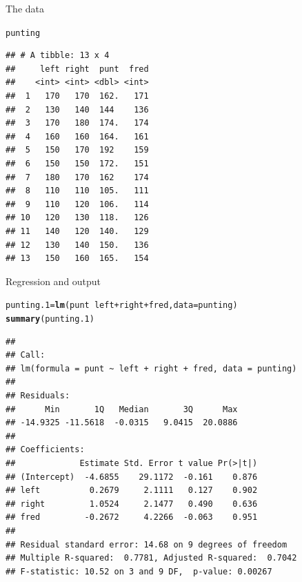\documentclass[unknownkeysallowed]{beamer}\usepackage[]{graphicx}\usepackage[]{color}
\makeatletter
\newcommand{\hlopt}[1]{\textcolor[rgb]{0,0,0}{#1}}%
\newcommand{\hlstd}[1]{\textcolor[rgb]{0.345,0.345,0.345}{#1}}%
\newcommand{\hlkwb}[1]{\textcolor[rgb]{0.69,0.353,0.396}{#1}}%
\newcommand{\hlkwc}[1]{\textcolor[rgb]{0.333,0.667,0.333}{#1}}%
\newcommand{\hlkwd}[1]{\textcolor[rgb]{0.737,0.353,0.396}{\textbf{#1}}}%
\newenvironment{kframe}{%
 \def\at@end@of@kframe{}%
 \ifinner\ifhmode%
  \def\at@end@of@kframe{\end{minipage}}%
  \begin{minipage}{\columnwidth}%
 \fi\fi%
 \def\FrameCommand##1{\hskip\@totalleftmargin \hskip-\fboxsep
 \colorbox{shadecolor}{##1}\hskip-\fboxsep
     \hskip-\linewidth \hskip-\@totalleftmargin \hskip\columnwidth}%
 \MakeFramed {\advance\hsize-\width
   \@totalleftmargin\z@ \linewidth\hsize
   \@setminipage}}%
 {\par\unskip\endMakeFramed%
 \at@end@of@kframe}
\newenvironment{knitrout}{}{} %
\makeatother
\begin{document}
\begin{frame}[fragile]{The data}
  
\begin{knitrout}\small
{}\color{fgcolor}\begin{kframe}
\begin{alltt}
\hlstd{punting}
\end{alltt}
\begin{verbatim}
## # A tibble: 13 x 4
##     left right  punt  fred
##    <int> <int> <dbl> <int>
##  1   170   170  162.   171
##  2   130   140  144    136
##  3   170   180  174.   174
##  4   160   160  164.   161
##  5   150   170  192    159
##  6   150   150  172.   151
##  7   180   170  162    174
##  8   110   110  105.   111
##  9   110   120  106.   114
## 10   120   130  118.   126
## 11   140   120  140.   129
## 12   130   140  150.   136
## 13   150   160  165.   154
\end{verbatim}
\end{kframe}
\end{knitrout}
  
\end{frame}

\begin{frame}[fragile]{Regression and output}

 
\begin{knitrout}\footnotesize
{}\color{fgcolor}\begin{kframe}
\begin{alltt}
\hlstd{punting.1}\hlkwb{=}\hlkwd{lm}\hlstd{(punt}\hlopt{~}\hlstd{left}\hlopt{+}\hlstd{right}\hlopt{+}\hlstd{fred,}\hlkwc{data}\hlstd{=punting)}
\hlkwd{summary}\hlstd{(punting.1)}
\end{alltt}
\begin{verbatim}
## 
## Call:
## lm(formula = punt ~ left + right + fred, data = punting)
## 
## Residuals:
##      Min       1Q   Median       3Q      Max 
## -14.9325 -11.5618  -0.0315   9.0415  20.0886 
## 
## Coefficients:
##             Estimate Std. Error t value Pr(>|t|)
## (Intercept)  -4.6855    29.1172  -0.161    0.876
## left          0.2679     2.1111   0.127    0.902
## right         1.0524     2.1477   0.490    0.636
## fred         -0.2672     4.2266  -0.063    0.951
## 
## Residual standard error: 14.68 on 9 degrees of freedom
## Multiple R-squared:  0.7781,	Adjusted R-squared:  0.7042 
## F-statistic: 10.52 on 3 and 9 DF,  p-value: 0.00267
\end{verbatim}
\end{kframe}
\end{knitrout}


\end{frame}
\end{document}
